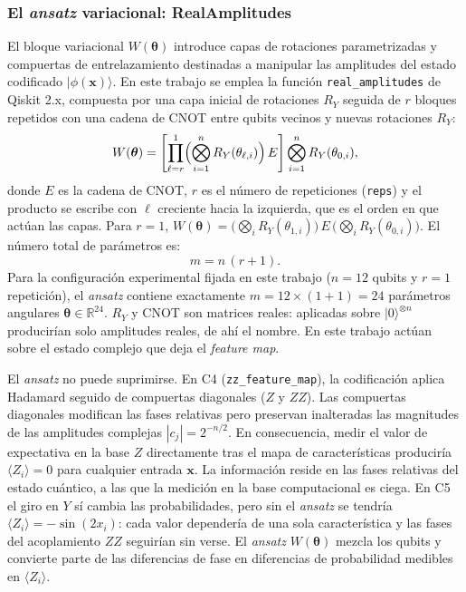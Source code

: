 
\subsubsection{El \textit{ansatz} variacional: RealAmplitudes}

El bloque variacional $W(\boldsymbol{\theta})$ introduce capas de rotaciones
parametrizadas y compuertas de entrelazamiento destinadas a manipular las amplitudes
del estado codificado $|\phi(\mathbf{x})\rangle$. En este trabajo se emplea la
función \texttt{real\_amplitudes} de Qiskit 2.x, compuesta por una capa inicial de
rotaciones $R_Y$ seguida de $r$ bloques repetidos con una cadena de CNOT entre qubits vecinos y nuevas rotaciones $R_Y$:
\begin{equation}
  W(\boldsymbol{\theta}) = \left[\prod_{\ell=r}^{1} \Bigl(\bigotimes_{i=1}^{n} R_Y(\theta_{\ell,i})\Bigr)\, E \right] \bigotimes_{i=1}^{n} R_Y(\theta_{0,i}),
  \label{eq:real_amplitudes}
\end{equation}
donde $E$ es la cadena de CNOT, $r$ es el número de repeticiones (\texttt{reps}) y el producto se
escribe con $\ell$ creciente hacia la izquierda, que es el orden en que actúan las capas. Para
$r = 1$, $W(\boldsymbol{\theta}) = \bigl(\bigotimes_i R_Y(\theta_{1,i})\bigr)\,E\,\bigl(\bigotimes_i R_Y(\theta_{0,i})\bigr)$.
El número total de parámetros es:
\begin{equation}
  m = n\,(r + 1).
  \label{eq:num_params_ansatz}
\end{equation}
Para la configuración experimental fijada en este trabajo ($n = 12$ qubits y $r = 1$
repetición), el \textit{ansatz} contiene exactamente $m = 12 \times (1 + 1) = 24$
parámetros angulares $\boldsymbol{\theta} \in \mathbb{R}^{24}$. $R_Y$ y CNOT son matrices reales: aplicadas sobre $|0\rangle^{\otimes n}$ producirían solo amplitudes reales, de ahí el nombre. En este trabajo actúan sobre el estado complejo que deja el \textit{feature map}.

El \textit{ansatz} no puede suprimirse. En C4 (\texttt{zz\_feature\_map}), la codificación
aplica Hadamard seguido de compuertas diagonales ($Z$ y $ZZ$). Las compuertas
diagonales modifican las fases relativas pero preservan inalteradas las magnitudes de las
amplitudes complejas $|c_j| = 2^{-n/2}$. En consecuencia, medir el valor de expectativa
en la base $Z$ directamente tras el mapa de características produciría
$\langle Z_i \rangle = 0$ para cualquier entrada $\mathbf{x}$. La información reside
en las fases relativas del estado cuántico, a las que la medición en la base
computacional es ciega. En C5 el giro en $Y$ sí cambia las probabilidades, pero sin el \textit{ansatz} se tendría
$\langle Z_i\rangle = -\sin(2x_i)$: cada valor dependería de una sola característica y las fases
del acoplamiento $ZZ$ seguirían sin verse. El \textit{ansatz} $W(\boldsymbol{\theta})$ mezcla los
qubits y convierte parte de las diferencias de fase en diferencias de probabilidad medibles en
$\langle Z_i \rangle$.

